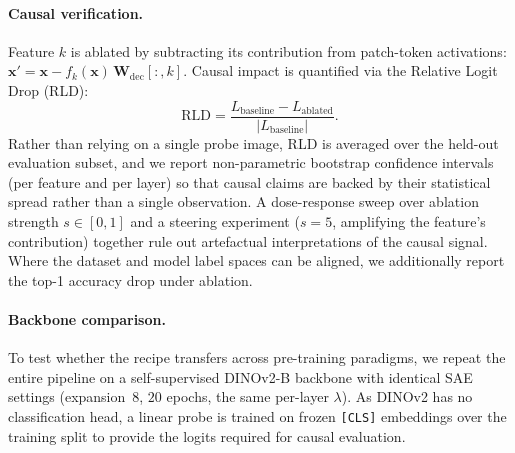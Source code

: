 \paragraph{Causal verification.}
Feature $k$ is ablated by subtracting its contribution from patch-token activations: $\mathbf{x}' = \mathbf{x} - f_k(\mathbf{x})\,\mathbf{W}_\text{dec}[:,k]$. Causal impact is quantified via the Relative Logit Drop (RLD):
\begin{equation}
  \text{RLD} = \frac{L_\text{baseline} - L_\text{ablated}}{|L_\text{baseline}|}.
\end{equation}
Rather than relying on a single probe image, RLD is averaged over the held-out evaluation subset, and we report non-parametric bootstrap confidence intervals (per feature and per layer) so that causal claims are backed by their statistical spread rather than a single observation. A dose-response sweep over ablation strength $s\!\in\![0,1]$ and a steering experiment ($s{=}5$, amplifying the feature's contribution) together rule out artefactual interpretations of the causal signal. Where the dataset and model label spaces can be aligned, we additionally report the top-1 accuracy drop under ablation.

\paragraph{Backbone comparison.}
To test whether the recipe transfers across pre-training paradigms, we repeat the entire pipeline on a self-supervised DINOv2-B backbone \cite{Caron2021} with identical SAE settings (expansion~$8$, $20$ epochs, the same per-layer $\lambda$). As DINOv2 has no classification head, a linear probe is trained on frozen \texttt{[CLS]} embeddings over the training split to provide the logits required for causal evaluation.


